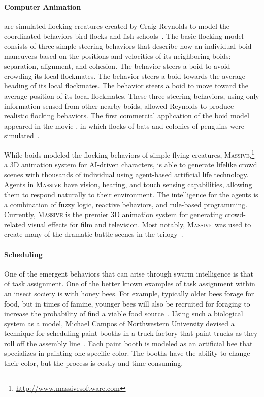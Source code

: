 \paragraph{Computer Animation\\}
 are simulated flocking creatures created by Craig Reynolds to model the coordinated behaviors bird flocks and fish schools~\cite{reynolds87flocks}.  The basic flocking model consists of three simple steering behaviors that describe how an individual boid maneuvers based on the positions and velocities of its neighboring boids: separation, alignment, and cohesion.  The  behavior steers a boid to avoid crowding its local flockmates.  The  behavior steers a boid towards the average heading of its local flockmates.  The  behavior steers a boid to move toward the average position of its local flockmates.  These three steering behaviors, using only information sensed from other nearby boids, allowed Reynolds to produce realistic flocking behaviors.  The first commercial application of the boid model appeared in the movie , in which flocks of bats and colonies of penguins were simulated~\cite{reynolds:Batman}.

While boids modeled the flocking behaviors of simple flying creatures, \textsc{Massive},\footnote{\url{http://www.massivesoftware.com}} a 3D animation system for AI-driven characters, is able to generate lifelike crowd scenes with thousands of individual  using agent-based artificial life technology.   Agents in \textsc{Massive} have vision, hearing, and touch sensing capabilities,  allowing them to respond naturally to their environment.  The intelligence for the agents is a combination of fuzzy logic, reactive behaviors, and rule-based programming.  Currently, \textsc{Massive} is the premier 3D animation system for generating crowd-related visual effects for film and television.   Most notably, \textsc{Massive} was used to create many of the dramatic battle scenes in the  trilogy~\cite{dkoeppel:MassiveAttack}.

\paragraph{Scheduling\\}
One of the emergent behaviors that can arise through swarm intelligence is that of task assignment.  One of the better known examples of task assignment within an insect society is with honey bees.  For example, typically older bees forage for food, but in times of famine, younger bees will also be recruited for foraging to increase the probability of find a viable food source~\cite{bonabeau:SwarmIntelligence}.  Using such a biological system as a model, Michael Campos of Northwestern University devised a technique for scheduling paint booths in a truck factory that paint trucks as they roll off the assembly line~\cite{bonabeau:SwarmSmarts}.  Each paint booth is modeled as an artificial bee that specializes in painting one specific color.  The booths have the ability to change their color, but the process is costly and time-consuming.  

